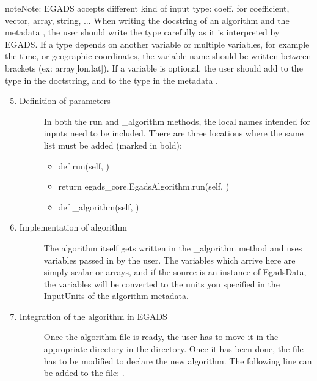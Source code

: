 \documentclass[a4paper,10pt,openany,english]{sphinxmanual}
\begin{document}
\begin{sphinxadmonition}{note}{Note:}
EGADS accepts different kind of input type: coeff. for coefficient, vector, array, string, ... When writing the docstring of an algorithm and the metadata , the user should write the type carefully as it is interpreted by EGADS. If a type depends on another variable or multiple variables, for example the time, or geographic coordinates, the variable name should be written between brackets (ex: array{[}lon,lat{]}). If a variable is optional, the user should add  to the type in the doctstring, and  to the type in the metadata .
\end{sphinxadmonition}
\begin{enumerate}
\setcounter{enumi}{4}
\item {} \begin{description}
\item[{Definition of parameters}] \leavevmode
In both the run and \_algorithm methods, the local names intended for inputs need to be included. There are three locations where the same list must be added (marked in bold):
\begin{itemize}
\item {} 
def run(self, )

\item {} 
return egads\_core.EgadsAlgorithm.run(self, )

\item {} 
def \_algorithm(self, )

\end{itemize}

\end{description}

\item {} \begin{description}
\item[{Implementation of algorithm}] \leavevmode
The algorithm itself gets written in the \_algorithm method and uses variables passed in by the user. The variables which arrive here are simply scalar or arrays, and if the source is an instance of EgadsData, the variables will be converted to the units you specified in the InputUnits of the algorithm metadata.

\end{description}

\item {} \begin{description}
\item[{Integration of the algorithm in EGADS}] \leavevmode
Once the algorithm file is ready, the user has to move it in the appropriate directory in the  directory. Once it has been done, the  file has to be modified to declare the new algorithm. The following line can be added to the  file: .


\end{description}
\end{enumerate}
\end{document}
